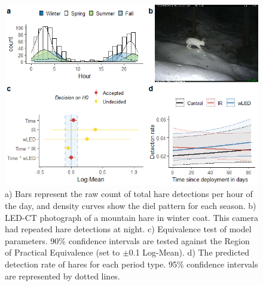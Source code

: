\begin{figure}[b]
	\centering
	\includegraphics[width=13cm]{../R/glmm_sp_files/figure-html/hare2-1.png}
	\caption[Mountain hare]
	{\footnotesize
		a) Bars represent the raw count of total hare detections per hour of the day, and density curves show the diel pattern for each season.
		b) LED-CT photograph of a mountain hare in winter coat. This camera had repeated hare detections at night.
		c) Equivalence test of model parameters. 90\% confidence intervals are tested against the Region of Practical Equivalence (set to $\pm$0.1 Log-Mean). 
		d) The predicted detection rate of hares for each period type. 95\% confidence intervals are represented by dotted lines.}
	\label{hare}
\end{figure}



